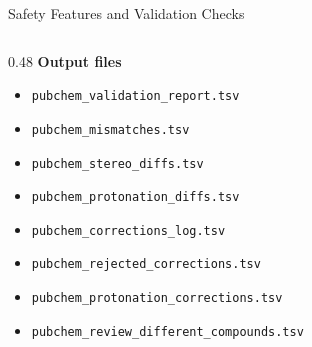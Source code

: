 \documentclass[aspectratio=169,11pt]{beamer}
\begin{document}
\begin{frame}{Safety Features and Validation Checks}
\begin{columns}[T]
\begin{column}{0.48\textwidth}
\smallskip
\textbf{Output files}\scriptsize
\begin{itemize}\setlength\itemsep{0pt}
  \item \texttt{pubchem\_validation\_report.tsv}
  \item \texttt{pubchem\_mismatches.tsv}
  \item \texttt{pubchem\_stereo\_diffs.tsv}
  \item \texttt{pubchem\_protonation\_diffs.tsv}
  \item \texttt{pubchem\_corrections\_log.tsv}
  \item \texttt{pubchem\_rejected\_corrections.tsv}
  \item \texttt{pubchem\_protonation\_corrections.tsv}
  \item \texttt{pubchem\_review\_different\_compounds.tsv}
\end{itemize}
\end{column}
\end{columns}

\end{frame}
\end{document}
